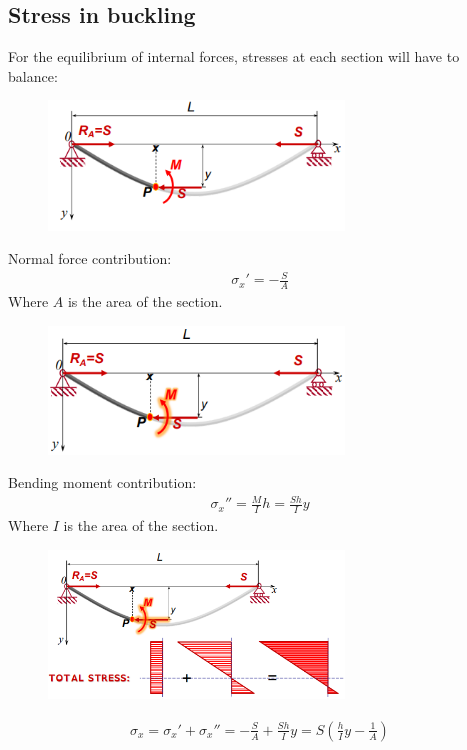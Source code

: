 \documentclass[class=report, crop=false, 12pt,a4paper]{standalone}
\begin{document}
\subsection{Stress in buckling}
For the equilibrium of internal forces, stresses at each section will have to balance:
\begin{figure}[H]
    \centering
    \includegraphics[width = 0.7\textwidth]{../img/diagram28.png}
    \caption{}
\end{figure}
Normal force contribution:
\begin{align}
    \sigma_x' = -\frac{S}{A}
\end{align}
Where $A$ is the area of the section.
\begin{figure}[H]
    \centering
    \includegraphics[width = 0.7\textwidth]{../img/diagram29.png}
    \caption{}
\end{figure}
Bending moment contribution:
\begin{align}
    \sigma_x'' = \frac{M}{I}h = \frac{Sh}{I}y
\end{align}
Where $I$ is the area of the section.
\begin{figure}[H]
    \centering
    \includegraphics[width = 0.7\textwidth]{../img/diagram30.png}
    \caption{}
\end{figure}
\begin{align}
    \sigma_x = \sigma_x' + \sigma_x''= -\frac{S}{A} + \frac{Sh}{I}y = S\left(\frac{h}{I}y - \frac{1}{A}\right)
\end{align}
\end{document}
